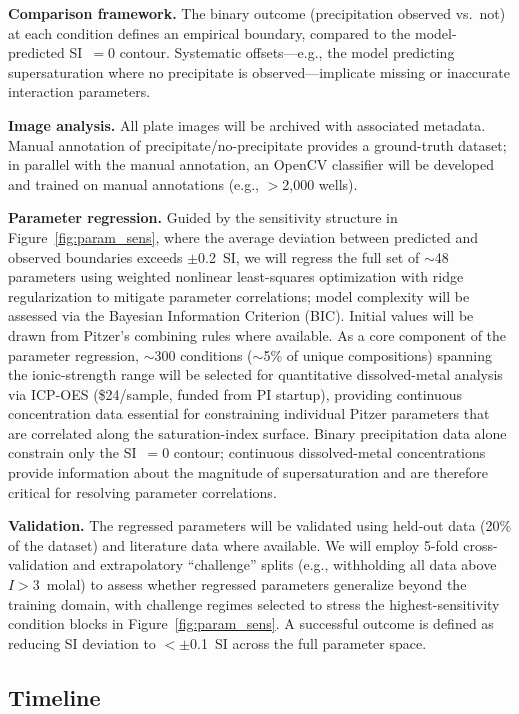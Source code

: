 \documentclass[12pt]{article}
\begin{document}
\textbf{Comparison framework.} The binary outcome (precipitation observed vs.\ not) at each condition defines an empirical boundary, compared to the model-predicted SI~$= 0$ contour. Systematic offsets---e.g., the model predicting supersaturation where no precipitate is observed---implicate missing or inaccurate interaction parameters.

\textbf{Image analysis.} All plate images will be archived with associated metadata. Manual annotation of precipitate/no-precipitate provides a ground-truth dataset; in parallel with the manual annotation, an OpenCV classifier \cite{bradski2000} will be developed and trained on manual annotations (e.g., $>$2,000 wells).

\textbf{Parameter regression.} Guided by the sensitivity structure in Figure~\ref{fig:param_sens}, where the average deviation between predicted and observed boundaries exceeds $\pm$0.2~SI, we will regress the full set of $\sim$48 parameters using weighted nonlinear least-squares optimization with ridge regularization to mitigate parameter correlations; model complexity will be assessed via the Bayesian Information Criterion (BIC). Initial values will be drawn from Pitzer's combining rules where available. As a core component of the parameter regression, $\sim$300 conditions ($\sim$5\% of unique compositions) spanning the ionic-strength range will be selected for quantitative dissolved-metal analysis via ICP-OES (\$24/sample, funded from PI startup), providing continuous concentration data essential for constraining individual Pitzer parameters that are correlated along the saturation-index surface. Binary precipitation data alone constrain only the SI~$= 0$ contour; continuous dissolved-metal concentrations provide information about the magnitude of supersaturation and are therefore critical for resolving parameter correlations.

\textbf{Validation.} The regressed parameters will be validated using held-out data (20\% of the dataset) and literature data where available. We will employ 5-fold cross-validation \cite{arlot2010} and extrapolatory ``challenge'' splits (e.g., withholding all data above $I > 3$~molal) to assess whether regressed parameters generalize beyond the training domain, with challenge regimes selected to stress the highest-sensitivity condition blocks in Figure~\ref{fig:param_sens}. A successful outcome is defined as reducing SI deviation to $< \pm$0.1~SI across the full parameter space.

\subsection{Timeline}
\end{document}
